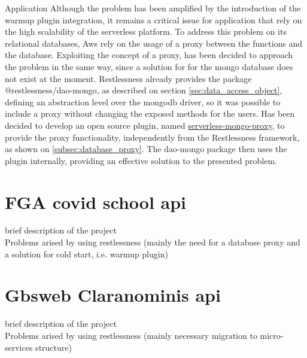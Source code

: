 \begin{chapter}{Application}
    Although the problem has been amplified by the introduction of the warmup plugin
    integration, it remains a critical issue for application that rely on the high
    scalability of the serverless platform.
    To address this problem on its relational databases, Aws rely on the usage of a
    proxy between the functions and the database. Exploiting the concept of a proxy,
    has been decided to approach the problem in the same way, since a solution for
    for the mongo database does not exist at the moment.
    Restlessness already provides the package @restlessness/dao-mongo, as described on
    section \ref{sec:data_access_object}, defining an abstraction level over the
    mongodb driver, so it was possible to include a proxy without changing the
    exposed methods for the users.
    Has been decided to develop an open source plugin, named
    \href{https://github.com/getapper/serverless-mongo-proxy}{serverless-mongo-proxy},
    to provide the proxy functionality, independently from the Restlessness framework,
    as shown on \ref{subsec:database_proxy}.
    The dao-mongo package then uses the plugin internally, providing an effective
    solution to the presented problem.

    \section{FGA covid school api}
    brief description of the project\\
    Problems arised by using restlessness (mainly the need for a database proxy
    and a solution for cold start, i.e. warmup plugin)


    \section{Gbsweb Claranominis api}
    brief description of the project\\
    Problems arised by using restlessness (mainly necessary migration to micro-services
    structure)

\end{chapter}
